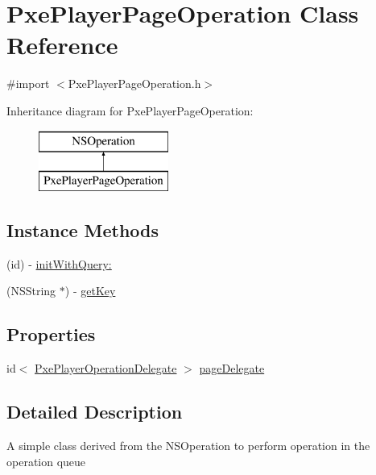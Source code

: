 \hypertarget{interface_pxe_player_page_operation}{\section{Pxe\-Player\-Page\-Operation Class Reference}
\label{interface_pxe_player_page_operation}
}


{\ttfamily \#import $<$Pxe\-Player\-Page\-Operation.\-h$>$}

Inheritance diagram for Pxe\-Player\-Page\-Operation\-:\begin{figure}[H]
\begin{center}
\leavevmode
\includegraphics[height=2.000000cm]{interface_pxe_player_page_operation}
\end{center}
\end{figure}
\subsection*{Instance Methods}
\begin{DoxyCompactItemize}
\item 
(id) -\/ \hyperlink{interface_pxe_player_page_operation_ae99c6e07252b13ecb652c50e8796e830}{init\-With\-Query\-:}
\item 
(N\-S\-String $\ast$) -\/ \hyperlink{interface_pxe_player_page_operation_a808493fa4430803e7546556b27170e9a}{get\-Key}
\end{DoxyCompactItemize}
\subsection*{Properties}
\begin{DoxyCompactItemize}
\item 
id$<$ \hyperlink{protocol_pxe_player_operation_delegate-p}{Pxe\-Player\-Operation\-Delegate} $>$ \hyperlink{interface_pxe_player_page_operation_a57ec43b30a26ea1b04081f9ed0b7d9a4}{page\-Delegate}
\end{DoxyCompactItemize}


\subsection{Detailed Description}
A simple class derived from the N\-S\-Operation to perform operation in the operation queue 


